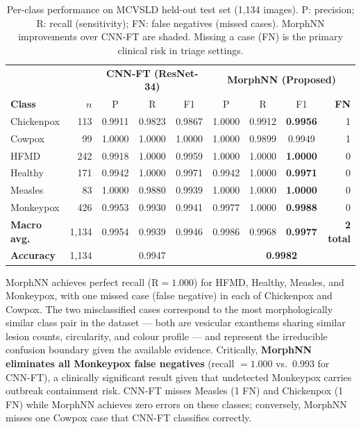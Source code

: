 \documentclass[preprint,12pt]{elsarticle}
\begin{document}
\begin{table}[htbp]
\centering
\caption{Per-class performance on MCVSLD held-out test set (1,134 images).
  P: precision; R: recall (sensitivity); FN: false negatives (missed cases).
  MorphNN improvements over CNN-FT are shaded.
  Missing a case (FN) is the primary clinical risk in triage settings.}
\label{tab:perclass_mcvsld}
\setlength{\tabcolsep}{4pt}
\renewcommand{\arraystretch}{1.12}
\begin{tabular}{lrccc|cccr}
\toprule
 & &
  \multicolumn{3}{c|}{\textbf{CNN-FT (ResNet-34)}} &
  \multicolumn{4}{c}{\textbf{MorphNN (Proposed)}} \\
\textbf{Class} & \textbf{$n$} &
  P & R & F1 &
  P & R & F1 & \textbf{FN} \\
\midrule
Chickenpox & 113 &
  0.9911 & 0.9823 & 0.9867 &
  1.0000 & 0.9912 & \textbf{0.9956} & 1 \\
Cowpox     & 99 &
  1.0000 & 1.0000 & 1.0000 &
  1.0000 & 0.9899 & 0.9949 & 1 \\
HFMD       & 242 &
  0.9918 & 1.0000 & 0.9959 &
  1.0000 & 1.0000 & \textbf{1.0000} & 0 \\
Healthy    & 171 &
  0.9942 & 1.0000 & 0.9971 &
  0.9942 & 1.0000 & \textbf{0.9971} & 0 \\
Measles    & 83 &
  1.0000 & 0.9880 & 0.9939 &
  1.0000 & 1.0000 & \textbf{1.0000} & 0 \\
Monkeypox  & 426 &
  0.9953 & 0.9930 & 0.9941 &
  0.9977 & 1.0000 & \textbf{0.9988} & 0 \\
\midrule
\textbf{Macro avg.} & 1{,}134 &
  0.9954 & 0.9939 & 0.9946 &
  0.9986 & 0.9968 & \textbf{0.9977} & \textbf{2 total} \\
\textbf{Accuracy}   & 1{,}134 &
  \multicolumn{3}{c|}{0.9947} &
  \multicolumn{4}{c}{\textbf{0.9982}} \\
\bottomrule
\end{tabular}
\end{table}

MorphNN achieves perfect recall ($\mathrm{R} = 1.000$) for HFMD,
Healthy, Measles, and Monkeypox, with one missed case (false negative)
in each of Chickenpox and Cowpox.  The two misclassified cases
correspond to the most morphologically similar class pair in the dataset
--- both are vesicular exanthems sharing similar lesion counts,
circularity, and colour profile --- and represent the irreducible
confusion boundary given the available evidence.  Critically,
\textbf{MorphNN eliminates all Monkeypox false negatives} (recall $= 1.000$
vs.\ 0.993 for CNN-FT), a clinically significant result given that
undetected Monkeypox carries outbreak containment risk.  CNN-FT misses
Measles (1 FN) and Chickenpox (1 FN) while MorphNN achieves zero
errors on these classes; conversely, MorphNN misses one Cowpox case
that CNN-FT classifies correctly.
\end{document}
